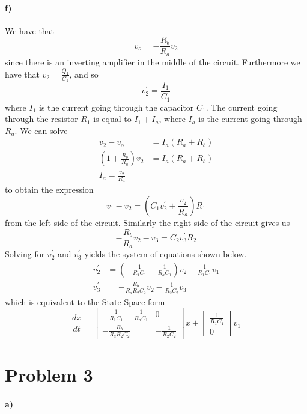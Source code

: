 \documentclass[12pt]{article}
\begin{document}
\paragraph{f)}

We have that
\[v_o = -\frac{R_b}{R_a}v_2\]
since there is an inverting amplifier in the middle
of the circuit. Furthermore we have that \(v_2 = \frac{Q_1}{C_1}\), and so
\[v_2^\prime = \frac{I_1}{C_1}\]
where \(I_1\) is the current going through the capacitor \(C_1\). The current going through the
resistor \(R_1\) is equal to \(I_1 + I_a\), where \(I_a\) is the current going through \(R_a\). We can solve
\begin{align*}
    v_2-v_o &= I_a(R_a+R_b)\\
    \left(1+\frac{R_b}{R_a}\right)v_2&=I_a(R_a+R_b)\\
    I_a=\frac{v_2}{R_a}
\end{align*}
to obtain the expression
\[v_1-v_2 = \left(C_1v_2^\prime + \frac{v_2}{R_a}\right)R_1\]
from the left side of the circuit. Similarly the right side of
the circuit gives us
\[-\frac{R_b}{R_a}v_2-v_3 = C_2v_3^\prime R_2\]
Solving for \(v_2^\prime\) and \(v_3^\prime\) yields the system of equations shown below.
\begin{align*}
    v_2^\prime &=\left(-\frac{1}{R_1C_1}-\frac{1}{R_aC_1}\right)v_2 + \frac{1}{R_1C_1}v_1\\
    v_3^\prime &=-\frac{R_b}{R_aR_2C_2}v_2-\frac{1}{R_2C_2}v_3
\end{align*}
which is equivalent to the State-Space form
\[\frac{dx}{dt}=\begin{bmatrix}
    -\frac{1}{R_1C_1}-\frac{1}{R_aC_1} & 0\\
    -\frac{R_b}{R_aR_2C_2} & -\frac{1}{R_2C_2}
\end{bmatrix}x + \begin{bmatrix}
    \frac{1}{R_1C_1}\\
    0
\end{bmatrix}v_1\]

\section*{Problem 3}

\paragraph{a)}
\end{document}
